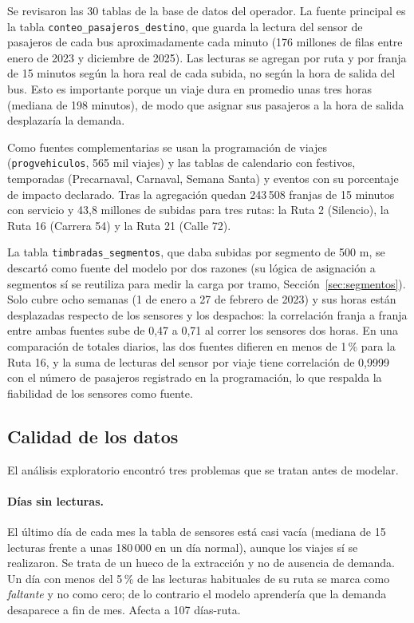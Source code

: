 \documentclass[11pt,a4paper]{article}
\begin{document}
Se revisaron las 30 tablas de la base de datos del operador. La fuente principal es la tabla \texttt{conteo\_pasajeros\_destino}, que guarda la lectura del sensor de pasajeros de cada bus aproximadamente cada minuto (176 millones de filas entre enero de 2023 y diciembre de 2025). Las lecturas se agregan por ruta y por franja de 15 minutos según la hora real de cada subida, no según la hora de salida del bus. Esto es importante porque un viaje dura en promedio unas tres horas (mediana de 198 minutos), de modo que asignar sus pasajeros a la hora de salida desplazaría la demanda.

Como fuentes complementarias se usan la programación de viajes (\texttt{progvehiculos}, 565 mil viajes) y las tablas de calendario con festivos, temporadas (Precarnaval, Carnaval, Semana Santa) y eventos con su porcentaje de impacto declarado. Tras la agregación quedan 243\,508 franjas de 15 minutos con servicio y 43,8 millones de subidas para tres rutas: la Ruta 2 (Silencio), la Ruta 16 (Carrera 54) y la Ruta 21 (Calle 72).

La tabla \texttt{timbradas\_segmentos}, que daba subidas por segmento de 500 m, se descartó como fuente del modelo por dos razones (su lógica de asignación a segmentos sí se reutiliza para medir la carga por tramo, Sección~\ref{sec:segmentos}). Solo cubre ocho semanas (1 de enero a 27 de febrero de 2023) y sus horas están desplazadas respecto de los sensores y los despachos: la correlación franja a franja entre ambas fuentes sube de 0,47 a 0,71 al correr los sensores dos horas. En una comparación de totales diarios, las dos fuentes difieren en menos de 1\,\% para la Ruta 16, y la suma de lecturas del sensor por viaje tiene correlación de 0,9999 con el número de pasajeros registrado en la programación, lo que respalda la fiabilidad de los sensores como fuente.

\subsection{Calidad de los datos}

El análisis exploratorio encontró tres problemas que se tratan antes de modelar.

\paragraph{Días sin lecturas.} El último día de cada mes la tabla de sensores está casi vacía (mediana de 15 lecturas frente a unas 180\,000 en un día normal), aunque los viajes sí se realizaron. Se trata de un hueco de la extracción y no de ausencia de demanda. Un día con menos del 5\,\% de las lecturas habituales de su ruta se marca como \emph{faltante} y no como cero; de lo contrario el modelo aprendería que la demanda desaparece a fin de mes. Afecta a 107 días-ruta.
\end{document}
